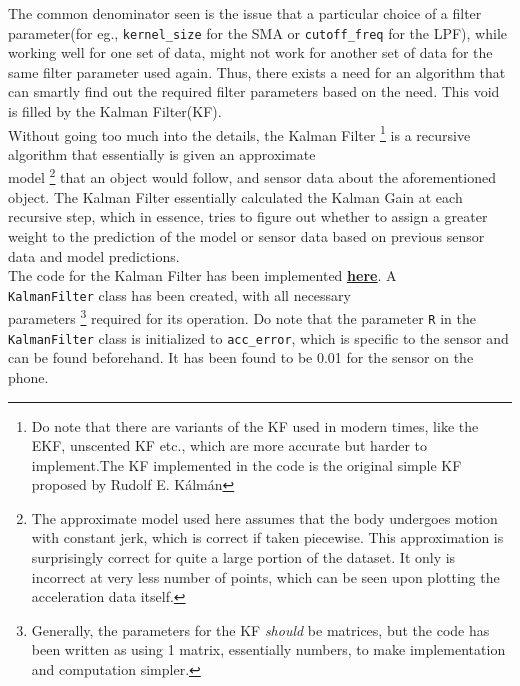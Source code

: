 \documentclass[oneside]{book}
\begin{document}
\bigskip
The common denominator seen is the issue that a particular choice of a filter parameter(for eg., \verb|kernel_size| for the SMA or \verb|cutoff_freq| for the LPF), while working well for one set of data, might not work for another set of data for the same filter parameter used again. Thus, there exists a need for an algorithm that can smartly find out the required filter parameters based on the need. This void is filled by the Kalman Filter(KF).\\ 
\bigskip
Without going too much into the details, the Kalman Filter \footnote{Do note that there are variants of the KF used in modern times, like the EKF, unscented KF etc., which are more accurate but harder to implement.The KF implemented in the code is the original simple KF proposed by Rudolf E. Kálmán} is a recursive algorithm that essentially is given an approximate\\ model \footnote{The approximate model used here assumes that the body undergoes motion with constant jerk, which is correct if taken piecewise. This approximation is surprisingly correct for quite a large portion of the dataset. It only is incorrect at very less number of points, which can be seen upon plotting the acceleration data itself.} that an object would follow, and sensor data about the aforementioned object. The Kalman Filter essentially calculated the Kalman Gain at each recursive step, which in essence, tries to figure out whether to assign a greater weight to the prediction of the model or sensor data based on previous sensor data and model predictions. \\ \bigskip
The code for the Kalman Filter has been implemented \href{https://github.com/HarryNyquist/Odometry/blob/main/Codes/1_KalmanFilter.cpp}{\underline{\textbf{here}}}. A \\ \verb|KalmanFilter| class has been created, with all necessary \\ parameters \footnote{Generally, the parameters for the KF \textit{should} be matrices, but the code has been written as using 1 matrix, essentially numbers, to make implementation and computation simpler.} required for its operation. Do note that the parameter \verb|R| in the \verb|KalmanFilter| class is initialized to \verb|acc_error|, which is specific to the sensor and can be found beforehand. It has been found to be 0.01 for the sensor on the phone. \newpage
\end{document}
